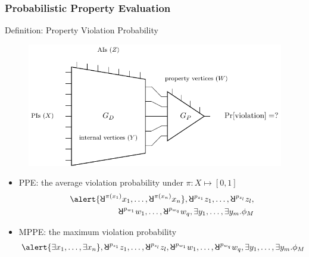 \begin{frame}
  \frametitle{Probabilistic Property Evaluation}
  \begin{block}{Definition: Property Violation Probability}
    \begin{figure}
      \centering
      \includegraphics[scale=0.6]{fig/prob-design-eval/prob-spbn-miter.pdf}
    \end{figure}
    \begin{itemize}
      \item PPE: the average violation probability under $\pi:X\mapsto[0,1]$
            \abovedisplayskip=0pt
            \belowdisplayskip=0pt
            \begin{align*}
              \alert{\random{\pi(x_1)}x_1,\ldots,\random{\pi(x_n)}x_n},
              \random{p_{z_1}}z_1,\ldots,\random{p_{z_l}}z_l, \\
              \random{p_{w_1}}w_1,\ldots,\random{p_{w_q}}w_q,
              \exists y_1,\ldots,\exists y_m.
              \pf_M
            \end{align*}
      \item MPPE: the maximum violation probability
            \abovedisplayskip=0pt
            \belowdisplayskip=0pt
            \begin{align*}
              \alert{\exists x_1,\ldots,\exists x_n},
              \random{p_{z_1}}z_1,\ldots,\random{p_{z_l}}z_l,
              \random{p_{w_1}}w_1,\ldots,\random{p_{w_q}}w_q,
              \exists y_1,\ldots,\exists y_m.
              \pf_M
            \end{align*}
    \end{itemize}
  \end{block}
\end{frame}


